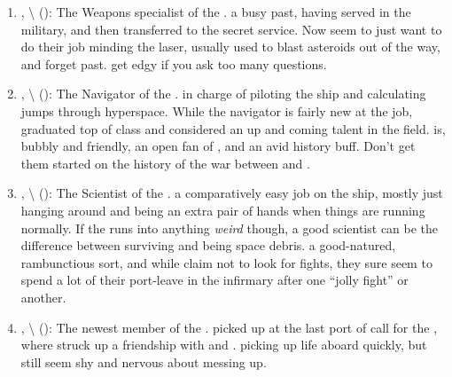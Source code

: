 \documentclass[blue]{TMFHope}
\begin{document}
\begin{enumerate}
  \item \cWeap{\full}, \cWeap{\they}\textbackslash\cWeap{\them} (\cWeap{\MYplayer}): The Weapons specialist of the \pNew{}. \cWeap{\Theyhave} a busy past, having served in the military, and then transferred to the secret service. Now \cWeap{\they} seem\cWeap{\plural} to just want to do their job minding the \pNew{} laser, usually used to blast asteroids out of the way, and forget \cWeap{\their} past. \cWeap{} get\cWeap{\plural} edgy if you ask too many questions.
  
  \item \cNav{\full}, \cNav{\they}\textbackslash\cNav{\them} (\cNav{\MYplayer}): The Navigator of the \pNew{}. \cNav{\Theyare} in charge of piloting the ship and calculating jumps through hyperspace. While the \pNew{} navigator is fairly new at the job, \cNav{\they} graduated top of \cNav{\their} class and  considered an up and coming talent in the field. \cNav{} is, bubbly and friendly, an open fan\cNav{\kid} of \cCap{}, and an avid history buff. Don't get them started on the history of the war between \pPlan{} and \pEdge{}.
  
  \item \cSci{\full}, \cSci{\they}\textbackslash\cSci{\them} (\cSci{\MYplayer}): The Scientist of the \pNew{}. \cSci{\Theyhave} a comparatively easy job on the ship, mostly just hanging around and being an extra pair of hands when things are running normally. If the \pNew{} runs into anything \emph{weird} though, a good scientist can be the difference between surviving and being space debris. \cSci{\Theyare} a good-natured, rambunctious sort, and while \cSci{\they} claim not to look for fights, they sure seem to spend a lot of their port-leave in the infirmary after one ``jolly fight'' or another.
  
  \item \cBoy{\full}, \cBoy{\they}\textbackslash\cBoy{\them} (\cBoy{\MYplayer}): The newest member of the \pNew{}. \cBoy{\Theywere} picked up at the last port of call for the \pNew{}, where \cBoy{\they} struck up a friendship with \cEng{} and \cNav{}. \cBoy{\Theyare} picking up life aboard \pNew{} quickly, but still seem shy and nervous about messing up.
\end{enumerate}
\end{document}
